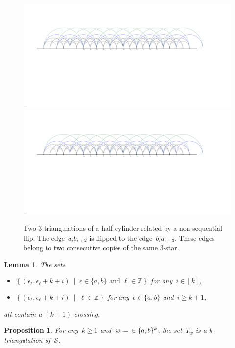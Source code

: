 \documentclass{amsart}
\newtheorem{proposition}[theorem]{Proposition}
\newtheorem{lemma}[theorem]{Lemma}
\theoremstyle{remark}
\newcommand{\Z}{\mathbb{Z}} %
\newcommand{\set}[2]{\left\{ #1 \;\middle|\; #2 \right\}} %
\newcommand{\eqdef}{\mbox{\,\raisebox{0.2ex}{\scriptsize\ensuremath{\mathrm:}}\ensuremath{=}\,}} %
\newcommand{\surface}{\mathcal{S}}
\begin{document}
\begin{figure}
	\capstart
	\includegraphics[page=2, scale=.5, clip, trim=15cm 0cm 17cm 0cm]{FNSk3p2} \\[.5cm]
	\includegraphics[page=3, scale=.5, clip, trim=15cm 0cm 17cm 0cm]{FNSk3p2}
	\caption{Two $3$-triangulations of a half cylinder related by a non-sequential flip. The edge~$a_ib_{i+2}$ is flipped to the edge~$b_ia_{i+3}$. These edges belong to two consecutive copies of the same $3$-star.}
	\label{fig:nonsequential}
\end{figure}

\begin{lemma}
\label{lem:noTwoDiagonalsEachLevel}
The sets
\begin{itemize}
\item $\set{(\epsilon_\ell, \epsilon_\ell+k+i)}{\epsilon \in \{a,b\} \text{ and } \ell \in \Z}$ for any~$i \in [k]$,
\item $\set{(\epsilon_\ell, \epsilon_\ell+k+i)}{\ell \in \Z}$ for any~$\epsilon \in \{a,b\}$ and~$i \ge k+1$,
\end{itemize}
all contain a $(k+1)$-crossing.
\end{lemma}

\begin{proposition}
For any~$k \ge 1$ and~$w \eqdef  \in \{a,b\}^k$, the set~$T_w$ is a $k$-triangulation of~$\surface$.
\end{proposition}
\end{document}
